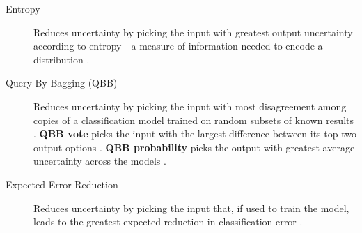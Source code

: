 \documentclass{sig-alternate}
\begin{document}
\begin{description}
\item[Entropy] Reduces uncertainty by picking the input with greatest output uncertainty according to entropy---a measure of information needed to encode a distribution \cite{settles2012:al-book}.
%
\item[Query-By-Bagging (QBB)] Reduces uncertainty by picking the input with most disagreement among copies of a classification model trained on random subsets of known results \cite{settles2012:al-book}.
\textbf{QBB vote} picks the input with the largest difference between its top two output options \cite{settles2012:al-book}.
\textbf{QBB probability} picks the output with greatest average uncertainty across the models \cite{abe1998:qbb}.
%
\item[Expected Error Reduction] Reduces uncertainty by picking the input that, if used to train the model, leads to the greatest expected reduction in classification error \cite{settles2012:al-book}.

\end{description}
\end{document}
